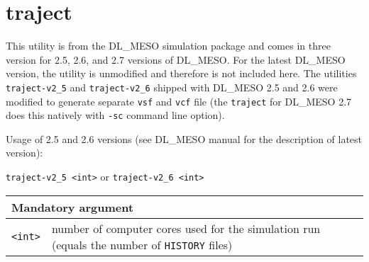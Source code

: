 \section{traject} \label{sec:traject}

This utility is from the DL\_MESO simulation package and comes in three
version for 2.5, 2.6, and 2.7 versions of DL\_MESO. For the latest DL\_MESO
version, the utility is unmodified and therefore is not included here. The
utilities \texttt{traject-v2\_5} and \texttt{traject-v2\_6} shipped with
DL\_MESO 2.5 and 2.6 were modified to generate separate \texttt{vsf} and
\texttt{vcf} file (the \texttt{traject} for DL\_MESO 2.7 does this natively
with \texttt{-sc} command line option).

Usage of 2.5 and 2.6 versions (see DL\_MESO manual for the description of
latest version):

\noindent
\vspace{1em}
\texttt{traject-v2\_5 <int>} or \texttt{traject-v2\_6 <int>}

\vspace{1em}
\noindent
\begin{longtable}{p{}p{}}
  \toprule
  \multicolumn{2}{l}{Mandatory argument} \\
  \midrule
  \texttt{<int>} & number of computer cores used for the simulation run
    (equals the number of \texttt{HISTORY} files) \\
  \bottomrule
\end{longtable}
